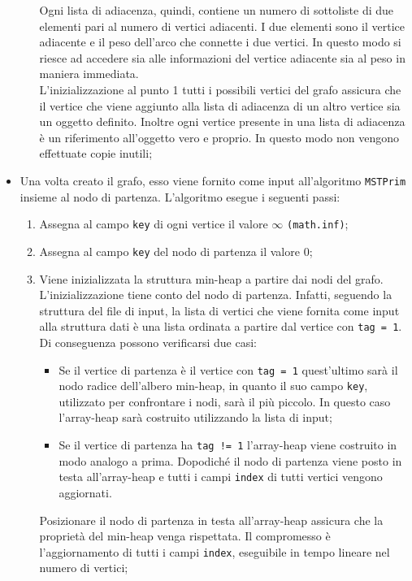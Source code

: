 \begin{itemize}
\begin{enumerate}
		Ogni lista di adiacenza, quindi, contiene un numero di sottoliste di due elementi pari al numero di vertici adiacenti. I due elementi sono il vertice adiacente e il peso dell'arco che connette i due vertici. In questo modo si riesce ad accedere sia alle informazioni del vertice adiacente sia al peso in maniera immediata.\\
		L'inizializzazione al punto 1 tutti i possibili vertici del grafo assicura che il vertice che viene aggiunto alla lista di adiacenza di un altro vertice sia un oggetto definito. Inoltre ogni vertice presente in una lista di adiacenza è un riferimento all'oggetto vero e proprio. In questo modo non vengono effettuate copie inutili;
	\end{enumerate}
	\item Una volta creato il grafo, esso viene fornito come input all'algoritmo \texttt{MSTPrim} insieme al nodo di partenza. L'algoritmo esegue i seguenti passi:
	\begin{enumerate}
		\item Assegna al campo \texttt{key} di ogni vertice il valore $\infty$ \texttt{(math.inf)};
		\item Assegna al campo \texttt{key} del nodo di partenza il valore 0;
		\item Viene inizializzata la struttura min-heap a partire dai nodi del grafo. L'inizializzazione tiene conto del nodo di partenza. Infatti, seguendo la struttura del file di input, la lista di vertici che viene fornita come input alla struttura dati è una lista ordinata a partire dal vertice con \texttt{tag = 1}. Di conseguenza possono verificarsi due casi:
		\begin{itemize}
			\item Se il vertice di partenza è il vertice con \texttt{tag = 1} quest'ultimo sarà il nodo radice dell'albero min-heap, in quanto il suo campo \texttt{key}, utilizzato per confrontare i nodi, sarà il più piccolo. In questo caso l'array-heap sarà costruito utilizzando la lista di input;
			\item Se il vertice di partenza ha \texttt{tag != 1} l'array-heap viene costruito in modo analogo a prima. Dopodiché il nodo di partenza viene posto in testa all'array-heap e tutti i campi \texttt{index} di tutti vertici vengono aggiornati.
		\end{itemize}
		Posizionare il nodo di partenza in testa all'array-heap assicura che la proprietà del min-heap venga rispettata. Il compromesso è l'aggiornamento di tutti i campi \texttt{index}, eseguibile in tempo lineare nel numero di vertici;

\end{enumerate}
\end{itemize}
